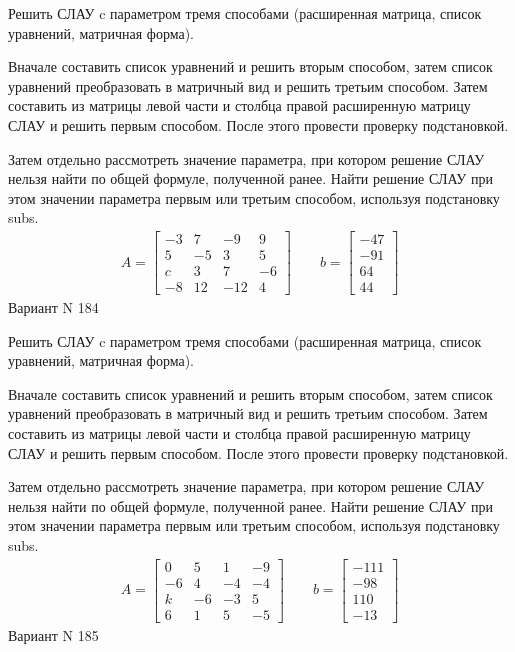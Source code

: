 \documentclass[11pt]{report}
\begin{document}
Решить СЛАУ c параметром тремя способами (расширенная матрица, список уравнений, матричная форма).

Вначале составить список уравнений и решить вторым способом,
затем список уравнений преобразовать в матричный вид и решить третьим способом.
Затем составить из матрицы левой части и столбца правой расширенную матрицу СЛАУ и решить первым способом.
После этого провести проверку подстановкой.

Затем отдельно рассмотреть значение параметра, при котором решение СЛАУ нельзя найти по общей формуле,
полученной ранее.
Найти решение СЛАУ при этом значении параметра первым или третьим способом, используя подстановку subs.
\begin{align*}
    A = \left[\begin{matrix}-3 & 7 & -9 & 9\\5 & -5 & 3 & 5\\c & 3 & 7 & -6\\-8 & 12 & -12 & 4\end{matrix}\right]
\qquad b = \left[\begin{matrix}-47\\-91\\64\\44\end{matrix}\right]
\end{align*}
\newpage
Вариант N 184


Решить СЛАУ c параметром тремя способами (расширенная матрица, список уравнений, матричная форма).

Вначале составить список уравнений и решить вторым способом,
затем список уравнений преобразовать в матричный вид и решить третьим способом.
Затем составить из матрицы левой части и столбца правой расширенную матрицу СЛАУ и решить первым способом.
После этого провести проверку подстановкой.

Затем отдельно рассмотреть значение параметра, при котором решение СЛАУ нельзя найти по общей формуле,
полученной ранее.
Найти решение СЛАУ при этом значении параметра первым или третьим способом, используя подстановку subs.
\begin{align*}
    A = \left[\begin{matrix}0 & 5 & 1 & -9\\-6 & 4 & -4 & -4\\k & -6 & -3 & 5\\6 & 1 & 5 & -5\end{matrix}\right]
\qquad b = \left[\begin{matrix}-111\\-98\\110\\-13\end{matrix}\right]
\end{align*}
\newpage
Вариант N 185
\end{document}

